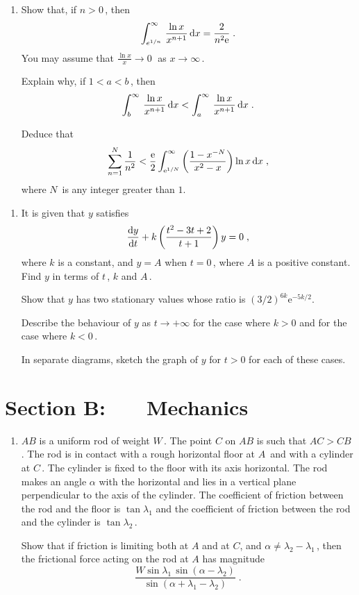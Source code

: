 \documentclass[a4, 11pt]{report}
\newlength{\qspace}
\newcounter{qnumber}
\newenvironment{question}%
 {\vspace{\qspace}
  \begin{enumerate}[\bfseries 1\quad][10]%
    \setcounter{enumi}{\value{qnumber}}%
    \item%
 }
{
  \end{enumerate}
  \filbreak
  \stepcounter{qnumber}
 }
\def\d{{\mathrm d}}
\def\e{{\mathrm e}}
\newcommand{\ds}{\displaystyle}
\begin{document}
\begin{question}
Show that, 
 if $n>0\,$, then
$$
\int_{e^{1/n}}^\infty\,{{\ln x} \over {x^{n+1}}}\,\d x
=  {2 \over  {n^2\e}}\;.  
$$
You may assume that $\ds \frac{\ln x} x \to 0\;$ as $x\to\infty\,$.


Explain why, if $1<a<b\,$, then
$$
\int_b^\infty\,{{\ln x} \over {x^{n+1}}}\,\d x  
<
\int_a^\infty\,{{\ln x} \over {x^{n+1}}}\,\d x\;.
$$


Deduce that
$$
\sum_{n=1}^{N}{1 \over n^2} <
{\e \over 2}\int_{\e^{1/N}}^{\infty}
\left({1-x^{-N}} \over {x^2-x}\right) \ln x\,\d x\;,
$$
where  $N\,$ is any integer greater than $1$.
\end{question}
		
\begin{question}	
It is given that $y$ satisfies
 $$
{{\d y} \over { \d t}} + 
k\left({{t^2-3t+2} \over {t+1}}\right)y = 0\;,
$$
where $k$ is a constant,  and $y=A $ when $t=0\,$, where $A$ is a positive constant.
Find $y$ in terms of $t\,$, $k$ and $A\,$.


Show that $y$ has two stationary values whose 
ratio is 
$(3/2)^{6k}
\e^{-5{k}/2}.$


Describe the behaviour of $y$ as $t \to +\infty$ for the case
where $k> 0$ and for the case where $k<0\,.$

In separate diagrams, sketch the graph of $y$  for $t>0$
for each of these cases. 
\end{question}	
		

		
	
\newpage
\section*{Section B: \ \ \ Mechanics}


	
\begin{question}
$AB$ is a uniform rod of weight $W\,$.
The point $C$  on $AB$ is such that $AC>CB\,$. The 
rod is in contact with a rough horizontal floor  at $A\,$ 
and with a cylinder at $C\,$. The cylinder   
is fixed to the floor with its axis horizontal.
The rod makes an angle ${\alpha}$ with 
the horizontal and lies in a vertical plane perpendicular to
the axis of the cylinder.
The coefficient  of friction between the rod
and the floor  is $\tan \lambda_1$ and the coefficient of friction
between the rod and the 
cylinder is $\tan \lambda_2\,$.  

Show that if friction is limiting 
both at $A$ and at $C$, and ${\alpha} \ne {\lambda}_2 - {\lambda}_1\,$, 
then the frictional force acting on the rod 
at $A$ has magnitude 
$$
\frac{ W\sin {\lambda}_1  \, \sin({\alpha}-{\lambda}_2)}
{\sin ({\alpha}+{\lambda}_1-{\lambda}_2)}
\;.$$
	\end{question}
	
\end{document}
